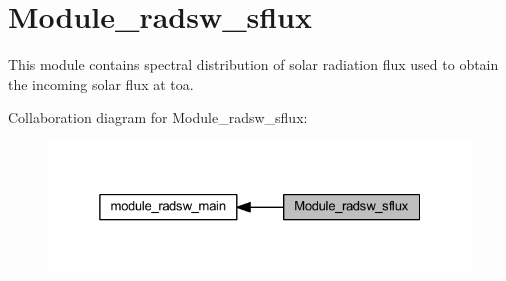 \hypertarget{group__module__radsw__sflux}{}\section{Module\+\_\+radsw\+\_\+sflux}
\label{group__module__radsw__sflux}


This module contains spectral distribution of solar radiation flux used to obtain the incoming solar flux at toa.  


Collaboration diagram for Module\+\_\+radsw\+\_\+sflux\+:\nopagebreak
\begin{figure}[H]
\begin{center}
\leavevmode
\includegraphics[width=325pt]{group__module__radsw__sflux}
\end{center}
\end{figure}
